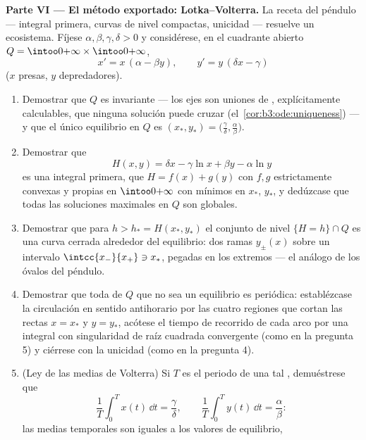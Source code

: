 \begin{problem}
\medskip
\noindent\textbf{Parte VI --- El método exportado: Lotka--Volterra.} La
receta del péndulo --- integral primera, curvas de nivel
compactas, unicidad --- resuelve un
ecosistema. Fíjese $\alpha, \beta, \gamma, \delta > 0$ y considérese, en
el cuadrante abierto $Q = \intoo0{+\infty}\times\intoo0{+\infty}$,
\[
x' = x\,(\alpha - \beta y), \qquad
y' = y\,(\delta x - \gamma)
\]
($x$ presas, $y$ depredadores).
\begin{enumerate}[resume]
  \item Demostrar que $Q$ es invariante --- los ejes son uniones de
  , explícitamente calculables,
  que ninguna solución puede cruzar (el~\cref{cor:b3:ode:uniqueness})
  --- y que el único equilibrio en $Q$ es $(x_*, y_*) =
        \bigl(\frac\gamma\delta, \frac\alpha\beta\bigr)$. \item
  Demostrar que
        \[
        H(x, y) = \delta x - \gamma\ln x + \beta y -
        \alpha\ln y
        \]
        es una integral primera, que $H = f(x) + g(y)$ con $f, g$
        estrictamente convexas y propias en $\intoo0{+\infty}$ con
        mínimos en $x_*$, $y_*$, y dedúzcase que todas las
        soluciones maximales en $Q$ son
        globales. \item Demostrar que para $h > h_* = H(x_*, y_*)$ el
        conjunto de nivel $\{H = h\}\cap Q$ es una curva cerrada
        alrededor del equilibrio: dos ramas
         $y_\pm(x)$ sobre
        un intervalo 
        $\intcc{x_-}{x_+} \ni x_*$, pegadas en los extremos --- el
        análogo de los óvalos del péndulo. \item Demostrar que toda
         de $Q$ que no sea un
        equilibrio es periódica: establézcase la circulación en sentido
        antihorario por las cuatro regiones que cortan las rectas
        $x = x_*$ y $y = y_*$, acótese el tiempo de recorrido de cada
        arco por una integral con singularidad de raíz cuadrada
        convergente (como en la pregunta 5) y ciérrese con la unicidad
        (como en la pregunta 4). \item (Ley de las medias de Volterra)
        Si $T$ es el periodo de una tal
        , demuéstrese que
        \[
        \frac1T\int_0^Tx(t)\,\dd t = \frac\gamma\delta,
        \qquad
        \frac1T\int_0^Ty(t)\,\dd t = \frac\alpha\beta :
        \]
        las medias temporales son iguales a los valores de equilibrio,

\end{enumerate}
\end{problem}
